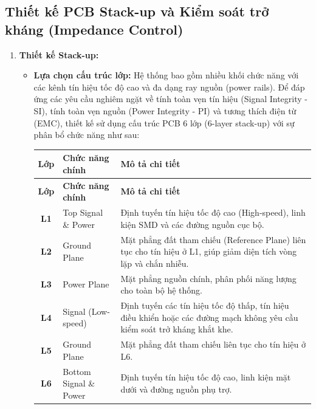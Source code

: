         \subsection{Thiết kế PCB Stack-up và Kiểm soát trở kháng (Impedance Control)}
            \begin{enumerate}
                \renewcommand{\labelenumi}{\alph{enumi}.}
                \item \textbf{Thiết kế Stack-up:}
                \begin{itemize}
                    \item \textbf{Lựa chọn cấu trúc lớp:} Hệ thống bao gồm nhiều khối chức năng với các kênh tín hiệu tốc độ cao và đa dạng ray nguồn (power rails). Để đáp ứng các yêu cầu nghiêm ngặt về tính toàn vẹn tín hiệu (Signal Integrity - SI), tính toàn vẹn nguồn (Power Integrity - PI) và tương thích điện từ (EMC), thiết kế sử dụng cấu trúc PCB 6 lớp (6-layer stack-up) với sự phân bổ chức năng như sau:
                    
                    \begin{longtable}{|c|l|p{8cm}|}
                        \hline
                        \textbf{Lớp} & \textbf{Chức năng chính} & \textbf{Mô tả chi tiết} \\\hline
                        \endfirsthead
                        \hline
                        \textbf{Lớp} & \textbf{Chức năng chính} & \textbf{Mô tả chi tiết} \\\hline
                        \endhead
                        \hline
                        \endfoot
                        \endlastfoot  
                        
                        \textbf{L1} & Top Signal \& Power & Định tuyến tín hiệu tốc độ cao (High-speed), linh kiện SMD và các đường nguồn cục bộ. \\\hline
                        \textbf{L2} & Ground Plane & Mặt phẳng đất tham chiếu (Reference Plane) liên tục cho tín hiệu ở L1, giúp giảm diện tích vòng lặp và chắn nhiễu. \\\hline
                        \textbf{L3} & Power Plane & Mặt phẳng nguồn chính, phân phối năng lượng cho toàn bộ hệ thống. \\\hline
                        \textbf{L4} & Signal (Low-speed) & Định tuyến các tín hiệu tốc độ thấp, tín hiệu điều khiển hoặc các đường mạch không yêu cầu kiểm soát trở kháng khắt khe. \\\hline
                        \textbf{L5} & Ground Plane & Mặt phẳng đất tham chiếu liên tục cho tín hiệu ở L6. \\\hline
                        \textbf{L6} & Bottom Signal \& Power & Định tuyến tín hiệu tốc độ cao, linh kiện mặt dưới và đường nguồn phụ trợ. \\\hline
                    \end{longtable}


\end{itemize}
\end{enumerate}
